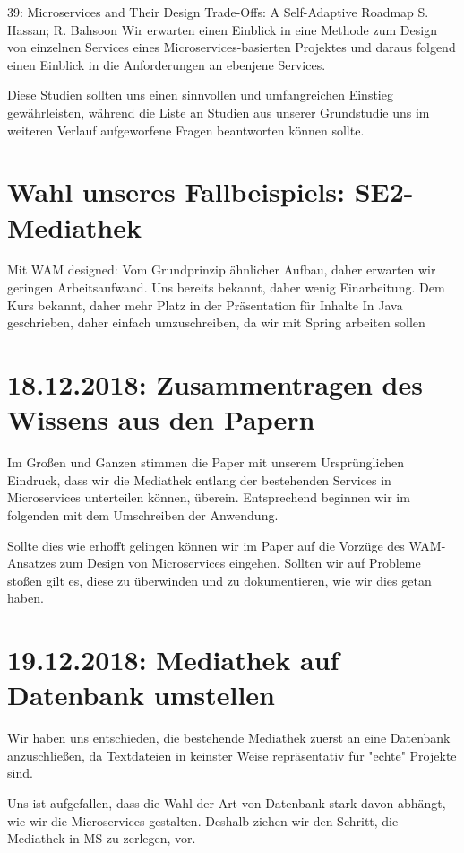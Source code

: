\documentclass{article}
\begin{document}
39: Microservices and Their Design Trade-Offs: A Self-Adaptive Roadmap
  S. Hassan; R. Bahsoon
Wir erwarten einen Einblick in eine Methode zum Design von einzelnen Services eines Microservices-basierten Projektes und daraus folgend einen Einblick in die Anforderungen an ebenjene Services.

Diese Studien sollten uns einen sinnvollen und umfangreichen Einstieg gewährleisten, während die Liste an Studien aus unserer Grundstudie uns im weiteren Verlauf aufgeworfene Fragen beantworten können sollte.

\section{Wahl unseres Fallbeispiels: SE2-Mediathek}

Mit WAM designed: Vom Grundprinzip ähnlicher Aufbau, daher erwarten wir geringen Arbeitsaufwand.
Uns bereits bekannt, daher wenig Einarbeitung.
Dem Kurs bekannt, daher mehr Platz in der Präsentation für Inhalte
In Java geschrieben, daher einfach umzuschreiben, da wir mit Spring arbeiten sollen


\section{18.12.2018: Zusammentragen des Wissens aus den Papern}

Im Großen und Ganzen stimmen die Paper mit unserem Ursprünglichen Eindruck, dass wir die Mediathek entlang der bestehenden Services in Microservices unterteilen können, überein.
Entsprechend beginnen wir im folgenden mit dem Umschreiben der Anwendung.

Sollte dies wie erhofft gelingen können wir im Paper auf die Vorzüge des WAM-Ansatzes zum Design von Microservices eingehen. Sollten wir auf Probleme stoßen gilt es, diese zu überwinden und zu dokumentieren, wie wir dies getan haben.

\section{19.12.2018: Mediathek auf Datenbank umstellen}

Wir haben uns entschieden, die bestehende Mediathek zuerst an eine Datenbank anzuschließen, da Textdateien in keinster Weise repräsentativ für "echte" Projekte sind.

Uns ist aufgefallen, dass die Wahl der Art von Datenbank stark davon abhängt, wie wir die Microservices gestalten. Deshalb ziehen wir den Schritt, die Mediathek in MS zu zerlegen, vor.
\end{document}

